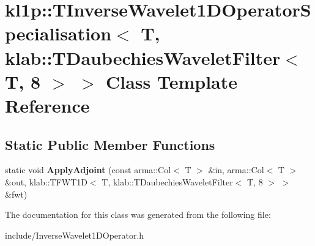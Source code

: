 \hypertarget{classkl1p_1_1TInverseWavelet1DOperatorSpecialisation_3_01T_00_01klab_1_1TDaubechiesWaveletFilter_3_01T_00_018_01_4_01_4}{}\section{kl1p\+:\+:T\+Inverse\+Wavelet1\+D\+Operator\+Specialisation$<$ T, klab\+:\+:T\+Daubechies\+Wavelet\+Filter$<$ T, 8 $>$ $>$ Class Template Reference}
\label{classkl1p_1_1TInverseWavelet1DOperatorSpecialisation_3_01T_00_01klab_1_1TDaubechiesWaveletFilter_3_01T_00_018_01_4_01_4}
\subsection*{Static Public Member Functions}
\begin{DoxyCompactItemize}
\item 
static void {\bfseries Apply\+Adjoint} (const arma\+::\+Col$<$ T $>$ \&in, arma\+::\+Col$<$ T $>$ \&out, klab\+::\+T\+F\+W\+T1D$<$ T, klab\+::\+T\+Daubechies\+Wavelet\+Filter$<$ T, 8 $>$ $>$ \&fwt)\hypertarget{classkl1p_1_1TInverseWavelet1DOperatorSpecialisation_3_01T_00_01klab_1_1TDaubechiesWaveletFilter_3_01T_00_018_01_4_01_4_a1c0ae148971396853d808abf8c9866c9}{}\label{classkl1p_1_1TInverseWavelet1DOperatorSpecialisation_3_01T_00_01klab_1_1TDaubechiesWaveletFilter_3_01T_00_018_01_4_01_4_a1c0ae148971396853d808abf8c9866c9}

\end{DoxyCompactItemize}


The documentation for this class was generated from the following file\+:\begin{DoxyCompactItemize}
\item 
include/Inverse\+Wavelet1\+D\+Operator.\+h\end{DoxyCompactItemize}
